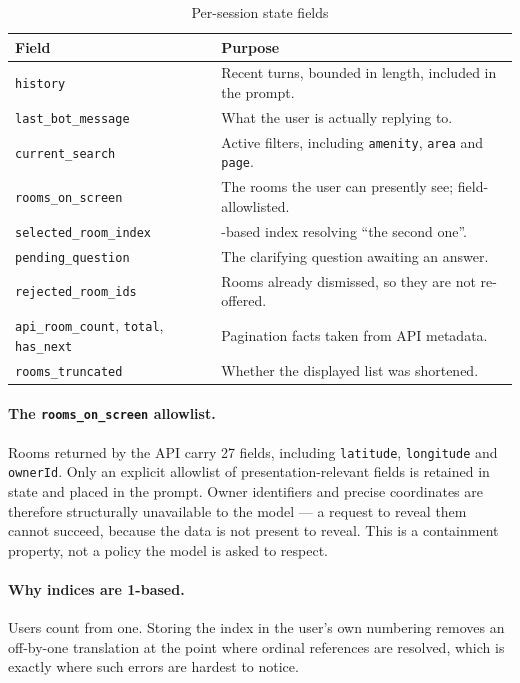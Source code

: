 \documentclass[11pt,a4paper]{article}
\newcommand{\fn}[1]{\texttt{\small #1}}
\begin{document}
\begin{table}[H]
\centering
\caption{Per-session state fields}
\small
\begin{tabularx}{\textwidth}{@{}l>{\raggedright\arraybackslash}X@{}}
\toprule
\textbf{Field} & \textbf{Purpose}\\
\midrule
\fn{history}              & Recent turns, bounded in length, included in the prompt.\\
\fn{last\_bot\_message}   & What the user is actually replying to.\\
\fn{current\_search}      & Active filters, including \fn{amenity}, \fn{area} and \fn{page}.\\
\fn{rooms\_on\_screen}    & The rooms the user can presently see; field-allowlisted.\\
\fn{selected\_room\_index}& 1-based index resolving ``the second one''.\\
\fn{pending\_question}    & The clarifying question awaiting an answer.\\
\fn{rejected\_room\_ids}  & Rooms already dismissed, so they are not re-offered.\\
\fn{api\_room\_count}, \fn{total}, \fn{has\_next} & Pagination facts taken from API metadata.\\
\fn{rooms\_truncated}     & Whether the displayed list was shortened.\\
\bottomrule
\end{tabularx}
\end{table}

\paragraph{The \fn{rooms\_on\_screen} allowlist.} Rooms returned by the API carry 27 fields,
including \fn{latitude}, \fn{longitude} and \fn{ownerId}. Only an explicit allowlist of
presentation-relevant fields is retained in state and placed in the prompt. Owner identifiers
and precise coordinates are therefore structurally unavailable to the model --- a request to
reveal them cannot succeed, because the data is not present to reveal. This is a containment
property, not a policy the model is asked to respect.

\paragraph{Why indices are 1-based.} Users count from one. Storing the index in the user's
own numbering removes an off-by-one translation at the point where ordinal references are
resolved, which is exactly where such errors are hardest to notice.
\end{document}
